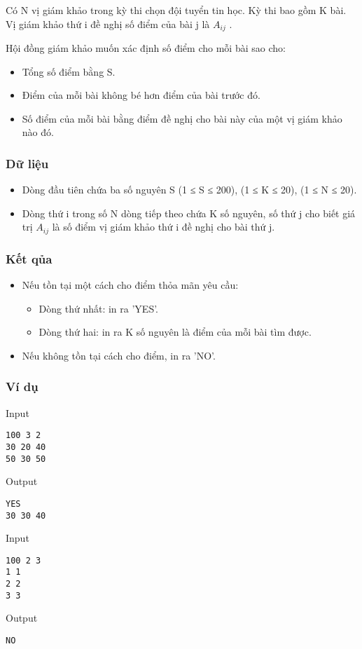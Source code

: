 

Có N vị giám khảo trong kỳ thi chọn đội tuyển tin học. Kỳ thi bao gồm K bài. Vị giám khảo thứ i đề nghị số điểm của bài j là $A_{ij}$ .

Hội đồng giám khảo muốn xác định số điểm cho mỗi bài sao cho:
\begin{itemize}
	\item Tổng số điểm bằng S.
	\item Điểm của mỗi bài không bé hơn điểm của bài trước đó.
	\item Số điểm của mỗi bài bằng điểm đề nghị cho bài này của một vị giám khảo nào đó.
\end{itemize}

\subsubsection{Dữ liệu}
\begin{itemize}
	\item Dòng đầu tiên chứa ba số nguyên S (1 ≤ S ≤ 200), (1 ≤ K ≤ 20), (1 ≤ N ≤ 20).
	\item Dòng thứ i trong số N dòng tiếp theo chứa K số nguyên, số thứ j cho biết giá trị $A_{ij}$ là số điểm vị giám khảo thứ i đề nghị cho bài thứ j.
\end{itemize}

\subsubsection{Kết qủa}
\begin{itemize}
	\item Nếu tồn tại một cách cho điểm thỏa mãn yêu cầu:
\begin{itemize}
	\item Dòng thứ nhất: in ra 'YES'.
	\item Dòng thứ hai: in ra K số nguyên là điểm của mỗi bài tìm được.
\end{itemize}
	\item Nếu không tồn tại cách cho điểm, in ra 'NO'.
\end{itemize}

\subsubsection{Ví dụ}

Input
\begin{verbatim}
100 3 2
30 20 40
50 30 50\end{verbatim}

Output
\begin{verbatim}
YES
30 30 40\end{verbatim}

Input
\begin{verbatim}
100 2 3
1 1
2 2
3 3\end{verbatim}

Output
\begin{verbatim}
NO\end{verbatim}
